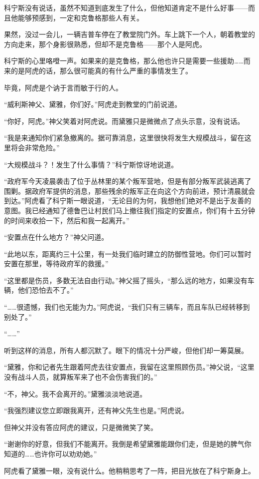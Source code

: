 科宁斯没有说话，虽然不知道到底发生了什么，但他知道肯定不是什么好事——而且他能够预感到，一定和克鲁格那些人有关。

果然，没过一会儿，一辆吉普车停在了教堂院门外。车上跳下一个人，朝着教堂的方向走来，那个身影很熟悉，但却不是克鲁格——那个人是阿虎。

科宁斯的心里咯噔一声。如果来的是克鲁格，那么他也许只是需要一些援助……而来的是阿虎的话，那么很可能真的有什么严重的事情发生了。

毕竟，阿虎是个讷于言而敏于行的人。

“威利斯神父、黛雅，你们好。”阿虎走到教堂的门前说道。

“你好，阿虎。”神父笑着对阿虎说。而黛雅只是微微点了点头示意，没有说话。

“我是来通知你们紧急撤离的。据可靠消息，这里很快将发生大规模战斗，留在这里将会非常危险。”

“大规模战斗？！发生了什么事情？”科宁斯惊讶地说道。

“政府军今天凌晨袭击了位于丛林里的某个叛军营地，但是有部分叛军武装逃离了围剿。据政府军提供的消息，那些残余的叛军正在向这个方向前进，预计清晨就会到达。”阿虎看了科宁斯一眼说道，“无论目的为何，我想他们绝对不是出于友善的意图。我已经通知了德鲁巴让村民们马上撤往我们指定的安置点，你们有十五分钟的时间来收拾一下，然后和我一起离开。”

“安置点在什么地方？”神父问道。

“此地以东，距离约三十公里，有一处我们临时建立的防御性营地。你们可以暂时安置在那里，等待政府军的救援。”

“这里都是伤员，多数无法自由行动。”神父摇了摇头，“那么远的地方，如果没有车辆，他们恐怕去不了。”

“……很遗憾，我们也无能为力。”阿虎说，“我们只有三辆车，而且车队已经转移到别处了。”

“……”

听到这样的消息，所有人都沉默了。眼下的情况十分严峻，但他们却一筹莫展。

“黛雅，你和记者先生跟着阿虎去往安置点，我留在这里照顾伤员。”神父说，“这里没有战斗人员，就算叛军来了也不会伤害我们的。”

“不，神父。我不会离开的。”黛雅淡淡地说道。

“我强烈建议您立即跟我离开，还有神父先生也是。”阿虎说。

但神父并没有答应阿虎的建议，只是微微笑了笑。

“谢谢你的好意，但我们不能离开。我倒是希望黛雅能跟你们走，但是她的脾气你知道的……也许你可以劝劝她。”

阿虎看了黛雅一眼，没有说什么。他稍稍思考了一阵，把目光放在了科宁斯身上。

